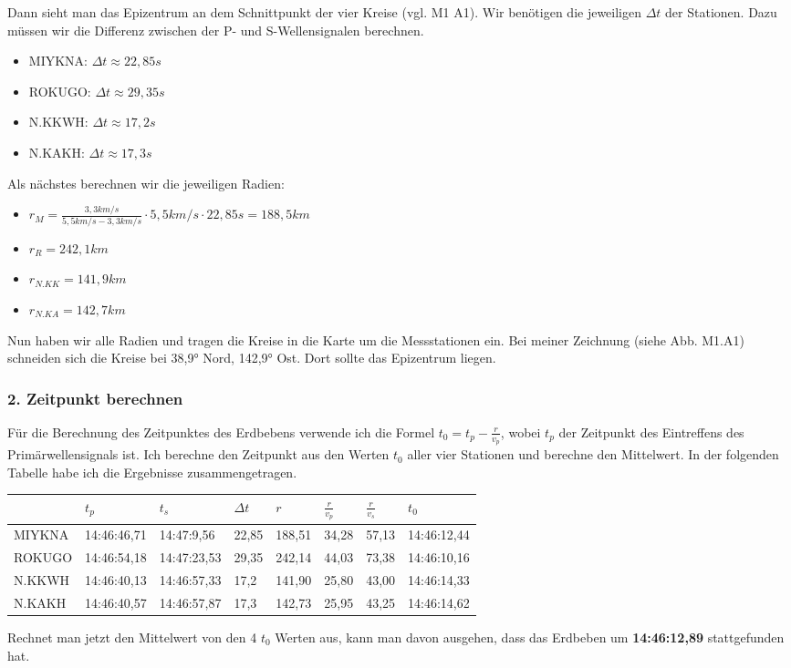 \documentclass{article}
\begin{document}
Dann sieht man das Epizentrum an dem Schnittpunkt der vier Kreise (vgl. M1 A1). 
Wir benötigen die jeweiligen $\Delta t$ der Stationen. Dazu müssen wir die Differenz zwischen der P- und S-Wellensignalen berechnen.
\begin{itemize}
	\item MIYKNA: $\Delta t \approx 22,85s$ 
	\item ROKUGO: $\Delta t \approx 29,35s$ 
	\item N.KKWH: $\Delta t \approx 17,2s$ 
	\item N.KAKH: $\Delta t \approx 17,3s$ 
\end{itemize}
Als nächstes berechnen wir die jeweiligen Radien: 
\begin{itemize}
	\item $r_M = \frac{3,3km/s}{5,5 km/s - 3,3 km/s} \cdot 5,5 km/s \cdot 22,85 s = 188,5 km$
	\item $r_R = 242,1km$
	\item $r_{N.KK} = 141,9km$
	\item $r_{N.KA} = 142,7km$
\end{itemize}
Nun haben wir alle Radien und tragen die Kreise in die Karte um die Messstationen ein. 
Bei meiner Zeichnung (siehe Abb. M1.A1) schneiden sich die Kreise bei 38,9° Nord, 142,9° Ost. Dort sollte das Epizentrum liegen. 
\subsubsection*{2. Zeitpunkt berechnen}
Für die Berechnung des Zeitpunktes des Erdbebens verwende ich die Formel 
$t_0 = t_p - \frac{r}{v_p}$, 
wobei $t_p$ der Zeitpunkt des Eintreffens des Primärwellensignals ist. 
Ich berechne den Zeitpunkt aus den Werten $t_0$ aller vier Stationen und berechne den Mittelwert. 
In der folgenden Tabelle habe ich die Ergebnisse zusammengetragen.
\begin{center}
\begin{tabular}{l|l|l|l|l|l|l|l}
		   & $t_{p}$         & $t_s$         & $\Delta t$ & $r$      & $\frac{r}{v_p}$    & $\frac{r}{v_s}$    & $t_0$          \\\hline
	MIYKNA & 14:46:46,71 & 14:47:9,56  & 22,85   & 188,51 & 34,28 & 57,13 & 14:46:12,44 \\
	ROKUGO & 14:46:54,18 & 14:47:23,53 & 29,35   & 242,14 & 44,03 & 73,38 & 14:46:10,16 \\
	N.KKWH & 14:46:40,13 & 14:46:57,33 & 17,2    & 141,90 & 25,80 & 43,00 & 14:46:14,33 \\
	N.KAKH & 14:46:40,57 & 14:46:57,87 & 17,3    & 142,73 & 25,95 & 43,25 & 14:46:14,62 
\end{tabular}
\end{center}
Rechnet man jetzt den Mittelwert von den 4 $t_0$ Werten aus, kann man davon ausgehen, 
dass das Erdbeben um \textbf{14:46:12,89} stattgefunden hat.
\end{document}
